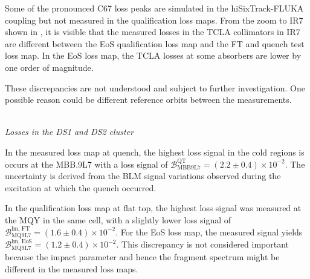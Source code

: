 
\newpage
Some of the pronounced C67 loss peaks are simulated in the hiSixTrack-FLUKA coupling but not measured in the qualification loss maps. From the zoom to IR7 shown in , it is visible that the measured losses in the TCLA collimators in IR7 are different between the EoS qualification loss map and the FT and quench test loss map. In the EoS loss map, the TCLA losses at some absorbers are lower by one order of magnitude. 

These discrepancies are not understood and subject to further investigation. One possible reason could be different reference orbits between the measurements. 

\mbox{} \\
\textit{Losses in the DS1 and DS2 cluster}
\vspace{0.2cm}

In the measured loss map at quench, the highest loss signal in the cold regions is occurs at the MBB.9L7 with a loss signal of $\mathcal{B}_\text{MBB9L7}^\text{QT} = (2.2 \pm 0.4) \times 10^{-2}$. The uncertainty is derived from the BLM signal variations observed during the excitation at which the quench occurred.
\vspace{0.2cm}

In the qualification loss map at flat top, the highest loss signal was measured at the MQY in the same cell, with a slightly lower loss signal of $\mathcal{B}_\text{MQ9L7}^\text{lm, FT} = (1.6 \pm 0.4) \times 10^{-2}$. For the EoS loss map, the measured signal yields $\mathcal{B}_\text{MQ9L7}^\text{lm, EoS} = (1.2 \pm 0.4) \times 10^{-2}$. This discrepancy is not considered important because the impact parameter and hence the fragment spectrum might be different in the measured loss maps. 
\vspace{0.2cm}

